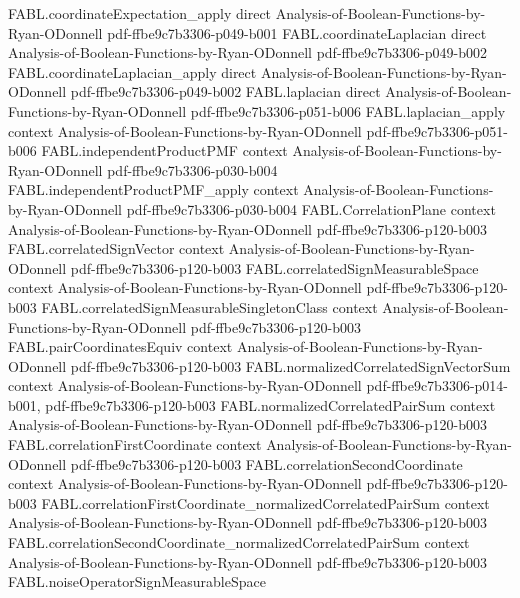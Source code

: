 \begin{theorem}
  {FABL.coordinateExpectation_apply}
  {direct}
  {Analysis-of-Boolean-Functions-by-Ryan-ODonnell}
  {pdf-ffbe9c7b3306-p049-b001}
\proofstep
  {FABL.coordinateLaplacian}
  {direct}
  {Analysis-of-Boolean-Functions-by-Ryan-ODonnell}
  {pdf-ffbe9c7b3306-p049-b002}
\proofstep
  {FABL.coordinateLaplacian_apply}
  {direct}
  {Analysis-of-Boolean-Functions-by-Ryan-ODonnell}
  {pdf-ffbe9c7b3306-p049-b002}
\proofstep
  {FABL.laplacian}
  {direct}
  {Analysis-of-Boolean-Functions-by-Ryan-ODonnell}
  {pdf-ffbe9c7b3306-p051-b006}
\proofstep
  {FABL.laplacian_apply}
  {context}
  {Analysis-of-Boolean-Functions-by-Ryan-ODonnell}
  {pdf-ffbe9c7b3306-p051-b006}
\proofstep
  {FABL.independentProductPMF}
  {context}
  {Analysis-of-Boolean-Functions-by-Ryan-ODonnell}
  {pdf-ffbe9c7b3306-p030-b004}
\proofstep
  {FABL.independentProductPMF_apply}
  {context}
  {Analysis-of-Boolean-Functions-by-Ryan-ODonnell}
  {pdf-ffbe9c7b3306-p030-b004}
\proofstep
  {FABL.CorrelationPlane}
  {context}
  {Analysis-of-Boolean-Functions-by-Ryan-ODonnell}
  {pdf-ffbe9c7b3306-p120-b003}
\proofstep
  {FABL.correlatedSignVector}
  {context}
  {Analysis-of-Boolean-Functions-by-Ryan-ODonnell}
  {pdf-ffbe9c7b3306-p120-b003}
\proofstep
  {FABL.correlatedSignMeasurableSpace}
  {context}
  {Analysis-of-Boolean-Functions-by-Ryan-ODonnell}
  {pdf-ffbe9c7b3306-p120-b003}
\proofstep
  {FABL.correlatedSignMeasurableSingletonClass}
  {context}
  {Analysis-of-Boolean-Functions-by-Ryan-ODonnell}
  {pdf-ffbe9c7b3306-p120-b003}
\proofstep
  {FABL.pairCoordinatesEquiv}
  {context}
  {Analysis-of-Boolean-Functions-by-Ryan-ODonnell}
  {pdf-ffbe9c7b3306-p120-b003}
\proofstep
  {FABL.normalizedCorrelatedSignVectorSum}
  {context}
  {Analysis-of-Boolean-Functions-by-Ryan-ODonnell}
  {pdf-ffbe9c7b3306-p014-b001,
    pdf-ffbe9c7b3306-p120-b003}
\proofstep
  {FABL.normalizedCorrelatedPairSum}
  {context}
  {Analysis-of-Boolean-Functions-by-Ryan-ODonnell}
  {pdf-ffbe9c7b3306-p120-b003}
\proofstep
  {FABL.correlationFirstCoordinate}
  {context}
  {Analysis-of-Boolean-Functions-by-Ryan-ODonnell}
  {pdf-ffbe9c7b3306-p120-b003}
\proofstep
  {FABL.correlationSecondCoordinate}
  {context}
  {Analysis-of-Boolean-Functions-by-Ryan-ODonnell}
  {pdf-ffbe9c7b3306-p120-b003}
\proofstep
  {FABL.correlationFirstCoordinate_normalizedCorrelatedPairSum}
  {context}
  {Analysis-of-Boolean-Functions-by-Ryan-ODonnell}
  {pdf-ffbe9c7b3306-p120-b003}
\proofstep
  {FABL.correlationSecondCoordinate_normalizedCorrelatedPairSum}
  {context}
  {Analysis-of-Boolean-Functions-by-Ryan-ODonnell}
  {pdf-ffbe9c7b3306-p120-b003}
\proofstep
  {FABL.noiseOperatorSignMeasurableSpace}

\end{theorem}
